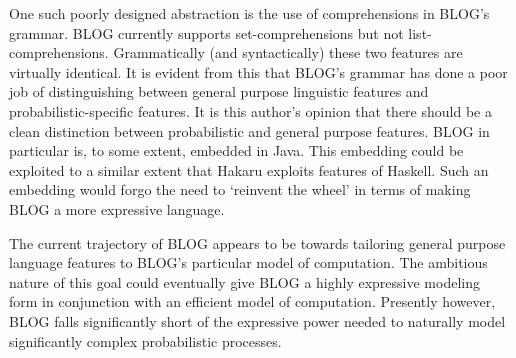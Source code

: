 One such poorly designed abstraction is the use of comprehensions
in BLOG's grammar. BLOG currently supports set-comprehensions
but not list-comprehensions. Grammatically (and syntactically) these
two features are virtually identical.
It is evident from this that BLOG's grammar has done a poor job of
distinguishing between general purpose linguistic features and
probabilistic-specific features. It is this author's opinion that
there should be a clean distinction between probabilistic and
general purpose features. BLOG in particular is, to some extent, embedded
in Java. This embedding could be exploited to a similar extent that
Hakaru exploits features of Haskell. Such an embedding would forgo the
need to `reinvent the wheel' in terms of making BLOG a more expressive
language.

The current trajectory of BLOG appears to be towards tailoring
general purpose language features to BLOG's particular model of computation.
The ambitious nature of this goal could eventually give BLOG a highly
expressive modeling form in conjunction with an efficient model of
computation. Presently however, BLOG falls significantly short of the
expressive power needed to naturally model significantly complex
probabilistic processes.


